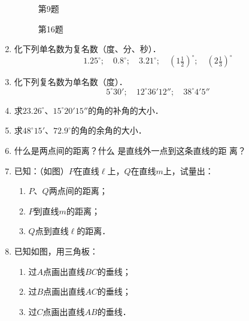\begin{enumerate}
\begin{figure}[htp]\centering
    \begin{minipage}[t]{0.48\textwidth}
    \centering
{}
    \caption*{第9题}
    \end{minipage}
    \begin{minipage}[t]{0.48\textwidth}
    \centering
    \caption*{第16题}
    \end{minipage}
    \end{figure}

\item 化下列单名数为复名数（度、分、秒）．
\[1.25^{\circ};\quad 0.8^{\circ};\quad 3.21^{\circ};\quad (1\tfrac{1}{2})^{\circ};\quad (2\tfrac{1}{3})^{\circ}\]
\item 化下列复名数为单名数（度）．
\[5^{\circ}30';\quad 12^{\circ}36'12'';\quad 38^{\circ}4'5''\]
\item 求$23.26^{\circ}$、$15^{\circ}20'15''$的角的补角的大小．
\item 求$48^{\circ}15'$、$72.9^{\circ}$的角的余角的大小．
\item 什么是两点间的距离？什么
是直线外一点到这条直线的距
离？



\item 已知：（如图）$P$在直线$\ell$上，$Q$在直线$m$上，试量出：
\begin{enumerate}
\item $P$、$Q$两点间的距离；
\item $P$到直线$m$的距离；
\item $Q$点到直线$\ell$的距离．
\end{enumerate}
\item 已知如图，用三角板：
\begin{enumerate}
\item 过$A$点画出直线$BC$的垂线；
\item 过$B$点画出直线$AC$的垂线；
\item 过$C$点画出直线$AB$的垂线．
\end{enumerate}


\end{enumerate}
